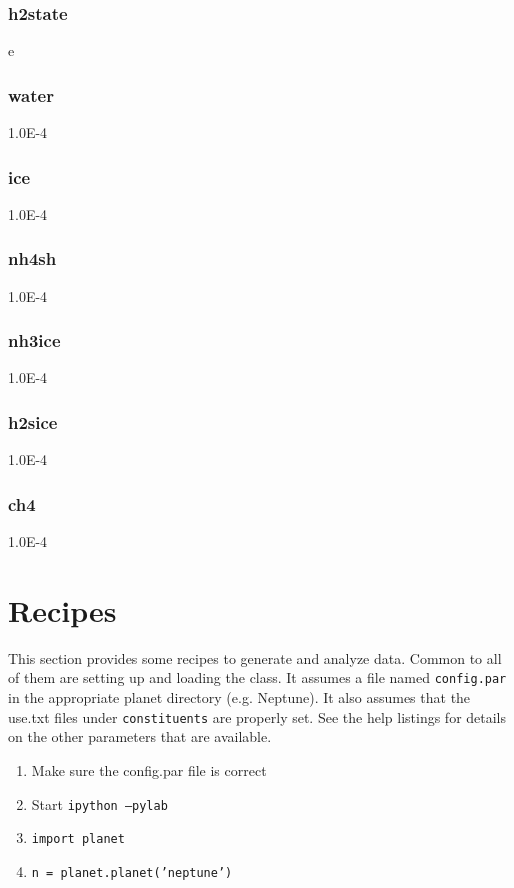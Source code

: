 \documentclass[11pt]{article}
\begin{document}
\subsubsection{h2state}
e

\subsubsection{water}
1.0E-4

\subsubsection{ice}
1.0E-4

\subsubsection{nh4sh}
1.0E-4

\subsubsection{nh3ice}
1.0E-4

\subsubsection{h2sice}
1.0E-4

\subsubsection{ch4 }
1.0E-4

\section{Recipes}
\label{recipes}
This section provides some recipes to generate and analyze data.  Common to all of them are setting up and loading the class.  It assumes a file named \texttt{config.par} in the appropriate planet directory (e.g. Neptune).  It also assumes that the use.txt files under \texttt{constituents} are properly set.  See the help listings for details on the other parameters that are available.
\begin{enumerate}
\item Make sure the config.par file is correct
\item Start \texttt{ipython --pylab}
\item \texttt{import planet}
\item \texttt{n = planet.planet('neptune')}
\end{enumerate}
\end{document}
